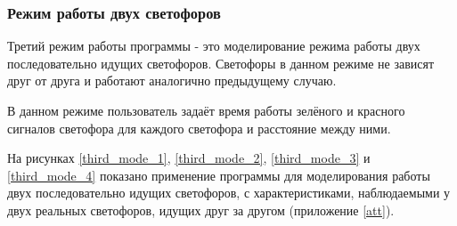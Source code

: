 \documentclass[12pt, a4paper]{extarticle}
\numberwithin{equation}{section}
\numberwithin{figure}{section}
\begin{document}
\subsubsection{Режим работы двух светофоров}

Третий режим работы программы - это моделирование режима работы двух последовательно идущих светофоров. Светофоры в данном режиме не зависят друг от друга и работают аналогично предыдущему случаю.

В данном режиме пользователь задаёт время работы зелёного и красного сигналов светофора для каждого светофора и расстояние между ними. 

На рисунках \ref{third_mode_1}, \ref{third_mode_2}, \ref{third_mode_3} и \ref{third_mode_4} показано применение программы для моделирования работы двух последовательно идущих светофоров, с характеристиками, наблюдаемыми у двух реальных светофоров, идущих друг за другом (приложение \ref{att}).
\end{document}
